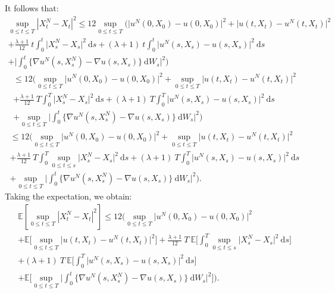 \documentclass{article}[12pt]
\newcommand{\E}{\mathbb{E}}
\newcommand{\di}{\mathrm{d}}
\begin{document}
        It follows that:
        \begin{multline*}
        \underset{0\leq t\leq T}{\sup}\left|X^{N}_t-X_t\right|^2\leq 12\underset{0\leq t\leq T}{\sup}\Bigg(\Big|u^N(0,X_0) - u(0,X_0)\Big|^2 + \Big|u(t,X_t) - u^N(t,X_t)\Big|^2 \\ + \frac{\lambda+1}{12}\ t\int_0^t \big|X_s^N- X_s\big|^2\ \di s + (\lambda+1)\ t\int_0^t \big|u^N(s,X_s) - u(s,X_s)\big|^2\ \di s \\+ \bigg|\int_0^t \{\nabla u^N(s,X_s^N) - \nabla u(s,X_s)\}\ \di W_s\bigg|^2 \Bigg)
        \end{multline*}
        \begin{multline*}
        \leq 12\Bigg(\underset{0\leq t\leq T}{\sup}\Big|u^N(0,X_0) - u(0,X_0)\Big|^2 + \underset{0\leq t\leq T}{\sup}\Big|u(t,X_t) - u^N(t,X_t)\Big|^2 \\ + \frac{\lambda+1}{12}\ T\int_0^T \big|X_s^N- X_s\big|^2\ \di s + (\lambda+1)\ T\int_0^T \big|u^N(s,X_s) - u(s,X_s)\big|^2\ \di s \\+ \underset{0\leq t\leq T}{\sup}\bigg|\int_0^t \{\nabla u^N(s,X_s^N) - \nabla u(s,X_s)\}\ \di W_s\bigg|^2 \Bigg)
        \end{multline*}
        \begin{multline*}
        \leq 12\Bigg(\underset{0\leq t\leq T}{\sup}\Big|u^N(0,X_0) - u(0,X_0)\Big|^2 + \underset{0\leq t\leq T}{\sup}\Big|u(t,X_t) - u^N(t,X_t)\Big|^2 \\ + \frac{\lambda+1}{12}\ T\int_0^T \underset{0\leq t\leq s}{\sup}\big|X_s^N- X_s\big|^2\ \di s + (\lambda+1)\ T\int_0^T \big|u^N(s,X_s) - u(s,X_s)\big|^2\ \di s \\+ \underset{0\leq t\leq T}{\sup}\bigg|\int_0^t \{\nabla u^N(s,X_s^N) - \nabla u(s,X_s)\}\ \di W_s\bigg|^2 \Bigg).
        \end{multline*}
        Taking the expectation, we obtain:
        \begin{multline*}
        \E\left[\underset{0\leq t\leq T}{\sup}\left|X^{N}_t-X_t\right|^2\right] \leq 12\Bigg(\underset{0\leq t\leq T}{\sup}\Big|u^N(0,X_0) - u(0,X_0)\Big|^2\\ + \E\bigg[\underset{0\leq t\leq T}{\sup}\Big|u(t,X_t) - u^N(t,X_t)\Big|^2\bigg] + \frac{\lambda+1}{12}\ T\ \E\bigg[\int_0^T \underset{0\leq t\leq s}{\sup}\big|X_s^N- X_s\big|^2\ \di s\bigg]\\ + (\lambda+1)\ T\ \E\bigg[\int_0^T \big|u^N(s,X_s) - u(s,X_s)\big|^2\ \di s\bigg]\\ +\E\bigg[ \underset{0\leq t\leq T}{\sup}\bigg|\int_0^t \{\nabla u^N(s,X_s^N) - \nabla u(s,X_s)\}\ \di W_s\bigg|^2 \bigg]\Bigg).
        \end{multline*}
        
\end{document}
